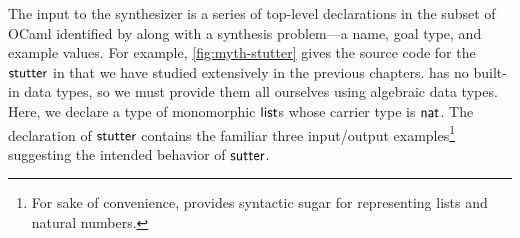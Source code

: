 

The input to the \myth{} synthesizer is a series of top-level declarations in the subset of OCaml identified by \mlsyn{} along with a synthesis problem---a name, goal type, and example values.
For example, \autoref{fig:myth-stutter} gives the source code for the $\mathsf{stutter}$ in \myth{} that we have studied extensively in the previous chapters.
\myth{} has no built-in data types, so we must provide them all ourselves using algebraic data types.
Here, we declare a type of monomorphic $\mathsf{list}$s whose carrier type is $\mathsf{nat}$.
The declaration of $\mathsf{stutter}$ contains the familiar three input/output examples\footnote{%
  For sake of convenience, \myth{} provides syntactic sugar for representing lists and natural numbers.
}
suggesting the intended behavior of $\mathsf{sutter}$.

